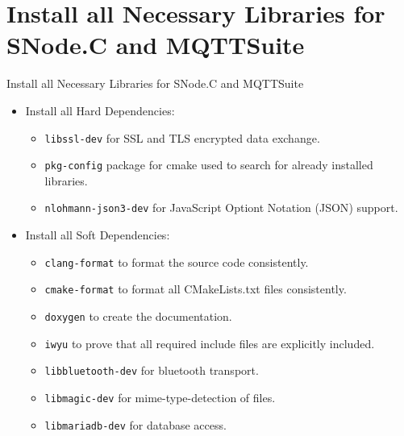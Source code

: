 ﻿\nosectionpage
\section{Install all Necessary Libraries for SNode.C and MQTTSuite}
\withsectionpage

\begin{frame}{Install all Necessary Libraries for SNode.C and MQTTSuite}
  \begin{itemize}
    \item Install all \alert{Hard Dependencies}:
    \begin{itemize}
      \item \texttt{\alert{libssl-dev}} for SSL and TLS encrypted data exchange.
      \item \texttt{\alert{pkg-config}} package for cmake used to search for already installed libraries.
      \item \texttt{\alert{nlohmann-json3-dev}} for \alert{J}ava\alert{S}cript \alert{O}ptiont \alert{N}otation (\alert{JSON}) support.
    \end{itemize}
    \item Install all \alert{Soft Dependencies}:
    \begin{itemize}
      \item \texttt{\alert{clang-format}} to format the source code consistently.
      \item \texttt{\alert{cmake-format}} to format all CMakeLists.txt files consistently.
      \item \texttt{\alert{doxygen}} to create the documentation.
      \item \texttt{\alert{iwyu}} to prove that all required include files are explicitly included.
      \item \texttt{\alert{libbluetooth-dev}} for bluetooth transport.
      \item \texttt{\alert{libmagic-dev}} for mime-type-detection of files.
      \item \texttt{\alert{libmariadb-dev}} for database access.
    \end{itemize}
  \end{itemize}
\end{frame}

